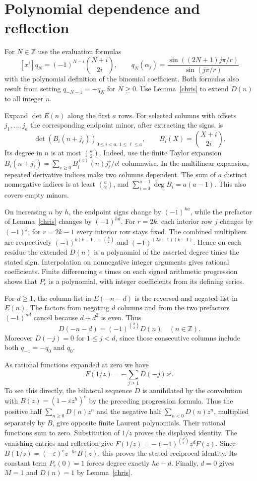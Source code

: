 \documentclass[11pt]{article}
\newcommand{\Z}{\mathbb Z}
\newcommand{\ee}{\varepsilon}
\DeclareMathOperator{\degop}{deg}
\begin{document}
\section{Polynomial dependence and reflection}
For $N\in\Z$ use the evaluation formulas
\[
 [x^i]q_N=(-1)^{N-i}\binom{N+i}{2i},\qquad
 q_N(\alpha_j)=\frac{\sin((2N+1)j\pi/r)}{\sin(j\pi/r)}
\]
with the polynomial definition of the binomial coefficient. Both formulas also result from setting $q_{-N-1}=-q_N$ for $N\ge0$. Use Lemma~\ref{chris} to extend $D(n)$ to all integer $n$.

Expand $\det E(n)$ along the first $a$ rows. For selected columns with offsets $j_1,\ldots,j_a$ the corresponding endpoint minor, after extracting the signs, is
\[
 \det(B_i(n+j_\ell))_{0\le i<a,\,1\le\ell\le a},
 \qquad B_i(X)=\binom{X+i}{2i}.
\]
Its degree in $n$ is at most $\binom a2$. Indeed, use the finite Taylor expansion $B_i(n+j_\ell)=\sum_{v\ge0} B_i^{(v)}(n)j_\ell^v/v!$ columnwise. In the multilinear expansion, repeated derivative indices make two columns dependent. The sum of $a$ distinct nonnegative indices is at least $\binom a2$, and $\sum_{i=0}^{a-1}\degop B_i=a(a-1)$. This also covers empty minors.

On increasing $n$ by $h$, the endpoint signs change by $(-1)^{ha}$, while the prefactor of Lemma~\ref{chris} changes by $(-1)^{hd}$. For $r=2k$, each interior row $j$ changes by $(-1)^j$; for $r=2k-1$ every interior row stays fixed. The combined multipliers are respectively $(-1)^{k(k-1)+\binom{k}{2}}$ and $(-1)^{(2k-1)(k-1)}$. Hence on each residue the extended $D(n)$ is a polynomial of the asserted degree times the stated sign. Interpolation on nonnegative integer arguments gives rational coefficients. Finite differencing $e$ times on each signed arithmetic progression shows that $P_e$ is a polynomial, with integer coefficients from its defining series.

For $d\ge1$, the column list in $E(-n-d)$ is the reversed and negated list in $E(n)$. The factors from negating $d$ columns and from the two prefactors $(-1)^{nd}$ cancel because $d+d^2$ is even. Thus
\[
 D(-n-d)=(-1)^{\binom d2}D(n)\quad(n\in\Z).
\]
Moreover $D(-j)=0$ for $1\le j<d$, since those consecutive columns include both $q_{-1}=-q_0$ and $q_0$.

As rational functions expanded at zero we have
\[
 F(1/z)=-\sum_{j\ge1}D(-j)z^j.
\]
To see this directly, the bilateral sequence $D$ is annihilated by the convolution with $B(z)=(1-\ee z^h)^e$ by the preceding progression formula. Thus the positive half $\sum_{n\ge0}D(n)z^n$ and the negative half $\sum_{n<0}D(n)z^n$, multiplied separately by $B$, give opposite finite Laurent polynomials. Their rational functions sum to zero. Substitution of $1/z$ proves the displayed identity. The vanishing entries and reflection give $F(1/z)=-(-1)^{\binom d2}z^d F(z)$. Since $B(1/z)=(-\ee)^e z^{-he}B(z)$, this proves the stated reciprocal identity. Its constant term $P_e(0)=1$ forces degree exactly $he-d$. Finally, $d=0$ gives $M=1$ and $D(n)=1$ by Lemma~\ref{chris}.
\end{document}
